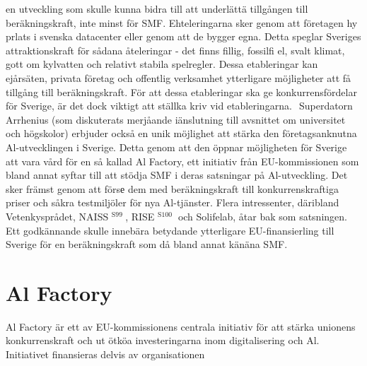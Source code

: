 {{en utveckling som skulle kunna bidra till att underlättä tillgången till beräkningskraft, inte minst för SMF. Ehteleringarna sker genom att företagen hy prlats i svenska datacenter eller genom att de bygger egna. Detta speglar Sveriges attraktionskraft för sådana åteleringar - det finns fillig, fossilfi el, svalt klimat, gott om kylvatten och relativt stabila spelregler. Dessa etableringar kan ejårsäten, privata företag och offentlig verksamhet ytterligare möjligheter att få tillgång till beräkningskraft. För att dessa etableringar ska ge konkurrensfördelar för Sverige, är det dock viktigt att ställka kriv vid etableringarna. \({ }^{}\)
Superdatorn Arrhenius (som diskuterats merjåande iänslutning till avsnittet om universitet och
högskolor) erbjuder också en unik möjlighet att stärka den företagsanknutna Al-utvecklingen i Sverige. Detta genom att den öppnar möjligheten för Sverige att vara vård för en så kallad Al Factory, ett initiativ från EU-kommissionen som bland annat syftar till att stödja SMF i deras satsningar på Al-utveckling. Det sker främst genom att försе dem med beräkningskraft till konkurrenskraftiga priser och såkra testmiljöler för nya Al-tjänster. Flera intressenter, däribland Vetenkysprådet, NAISS \({ }^{\text {S99 }}\), RISE \({ }^{\text {S100 }}\) och Solifelab, åtar bak som satsningen. Ett godkännande skulle innebära betydande ytterligare EU-finansierling till Sverige för en beräkningskraft som då bland annat känäna SMF.
\section*{Al Factory}
Al Factory är ett av EU-kommissionens centrala initiativ för att stärka unionens konkurrenskraft och ut ötköa investeringarna inom digitalisering och Al. Initiativet finansieras delvis av organisationen
}}
